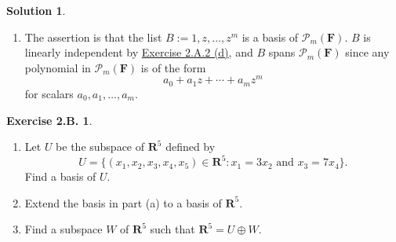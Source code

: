 \documentclass[12pt]{article}
\theoremstyle{definition}
\theoremstyle{exercise}
\newtheorem{exercise}{Exercise 2.B.}
\theoremstyle{solution}
\newtheorem*{solution}{Solution}
\newcommand{\R}{\mathbf{R}}
\newcommand{\F}{\mathbf{F}}
\begin{document}
\begin{solution}
\begin{enumerate}
        \item The assertion is that the list \( B := 1, z, \ldots, z^m \) is a basis of \( \mathcal{P}_m (\F) \). \( B \) is linearly independent by \href{https://lew98.github.io/Mathematics/LADR_Section_2_A_Exercises.pdf}{Exercise 2.A.2 (d)}, and \( B \) spans \( \mathcal{P}_m (\F) \) since any polynomial in \( \mathcal{P}_m (\F) \) is of the form
        \[
            a_0 + a_1 z + \cdots + a_m z^m
        \]
        for scalars \( a_0, a_1, \ldots, a_m \).
    \end{enumerate}
\end{solution}

\begin{exercise}
\label{ex:3}
    \begin{enumerate}
        \item Let \( U \) be the subspace of \( \R^5 \) defined by
        \[
            U = \{ (x_1, x_2, x_3, x_4, x_5) \in \R^5 : x_1 = 3 x_2 \text{ and } x_3 = 7 x_4 \}.
        \]
        Find a basis of \( U \).

        \item Extend the basis in part (a) to a basis of \( \R^5 \).

        \item Find a subspace \( W \) of \( \R^5 \) such that \( \R^5 = U \oplus W \).
    \end{enumerate}
\end{exercise}
\end{document}
